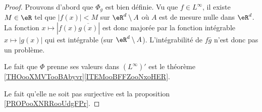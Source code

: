 \begin{proof}
	Prouvons d'abord que \( \Phi_g\) est bien définie. Vu que \( f\in L^{\infty}\), il existe \( M\in \eR\) tel que \( | f(x) |<M\) sur \( \eR^d\setminus A\) où \( A\) est de mesure nulle dans \( \eR^d\). La fonction \( x\mapsto| f(x)\overline{ g(x) } |\) est donc majorée par la fonction intégrable \( x\mapsto | g(x) |\) qui est intégrable (sur \( \eR^d\setminus A\)). L'intégrabilité de \( f\bar g\) n'est donc pas un problème.

	Le fait que \( \Phi\) prenne ses valeurs dans \( (L^{\infty})'\) est le théorème \ref{THOooXMVTooBAbyvr}\ref{ITEMooBFFZooNxoHER}.

	Le fait qu'elle ne soit pas surjective est la proposition \ref{PROPooXNRRooUdgFPr}.
\end{proof}
